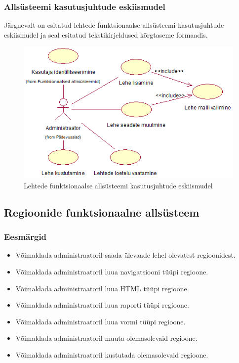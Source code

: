 \documentclass[a4paper,12pt]{article} %
\begin{document}
\subsubsection{Allsüsteemi kasutusjuhtude eskiismudel}
Järgnevalt on esitatud lehtede funktsionaalse allsüsteemi kasutusjuhtude eskiismudel ja seal esitatud tekstikirjeldused kõrgtaseme formaadis.
\begin{figure}[H]
\begin{center}
\includegraphics[bb=0 0 483 304,scale=1]{./diagrams/pages-subsystem-use-case-digram.png}
\caption{Lehtede funktsionaalse allsüsteemi kasutusjuhtude eskiismudel}
\end{center}
\end{figure}

\subsection{Regioonide funktsionaalne allsüsteem}
\subsubsection{Eesmärgid}
\begin{itemize}
\item Võimaldada administraatoril saada ülevaade lehel olevatest regioonidest.
\item Võimaldada administraatoril luua navigatsiooni tüüpi regioone.
\item Võimaldada administraatoril luua HTML tüüpi regioone.
\item Võimaldada administraatoril luua raporti tüüpi regioone.
\item Võimaldada administraatoril luua vormi tüüpi regioone.
\item Võimaldada administraatoril muuta olemasolevaid regioone.
\item Võimaldada administraatoril kustutada olemasolevaid regioone.
\end{itemize}
\end{document}
